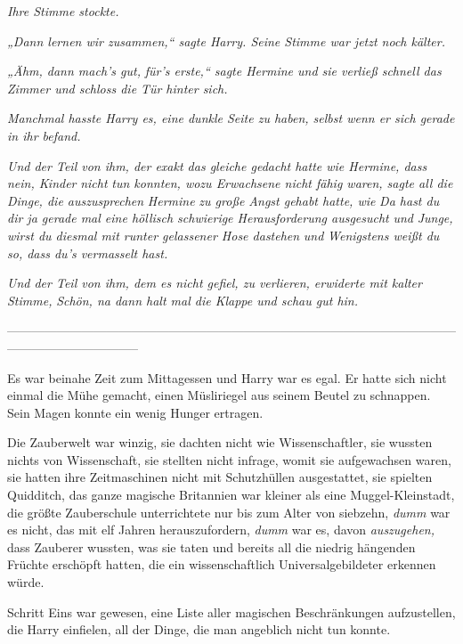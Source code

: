 {\emph{Ihre Stimme stockte.}

\emph{„Dann lernen wir zusammen,“ sagte Harry. Seine Stimme war jetzt noch kälter.}

\emph{„Ähm, dann mach's gut,} \emph{für's erste,“ sagte Hermine und sie verließ schnell das Zimmer und schloss die Tür hinter sich.}

\emph{Manchmal hasste Harry es, eine dunkle Seite zu haben, selbst wenn er sich gerade in ihr befand.}

\emph{Und der Teil von ihm, der exakt das gleiche gedacht hatte wie Hermine, dass nein, Kinder} \emph{\emph{nicht}} \emph{tun konnten, wozu Erwachsene nicht fähig waren, sagte all die Dinge, die auszusprechen} \emph{Hermine} \emph{zu große Angst gehabt hatte, wie} \emph{\emph{Da hast du dir ja gerade mal eine höllisch schwierige Herausforderung ausgesucht}} \emph{und} \emph{\emph{Junge, wirst du diesmal mit runter gelassener Hose dastehen}} \emph{und} \emph{\emph{Wenigstens weißt du so, dass du's vermasselt hast.}}

\emph{Und der Teil von ihm, dem es nicht gefiel, zu verlieren, erwiderte mit kalter Stimme,} \emph{\emph{Schön, na dann halt mal die Klappe und schau gut hin.}}

--------------------------------------------------------------------------------------------------------------------------------------------

\hfill\break Es war beinahe Zeit zum Mittagessen und Harry war es egal. Er hatte sich nicht einmal die Mühe gemacht, einen Müsliriegel aus seinem Beutel zu schnappen. Sein Magen konnte ein wenig Hunger ertragen.

Die Zauberwelt war winzig, sie dachten nicht wie Wissenschaftler, sie wussten nichts von Wissenschaft, sie stellten nicht infrage, womit sie aufgewachsen waren, sie hatten ihre Zeitmaschinen nicht mit Schutzhüllen ausgestattet, sie spielten Quidditch, das ganze magische Britannien war kleiner als eine Muggel-Kleinstadt, die größte Zauberschule unterrichtete nur bis zum Alter von siebzehn, \emph{dumm} war es nicht, das mit elf Jahren herauszufordern, \emph{dumm} war es, davon \emph{auszugehen,} dass Zauberer wussten, was sie taten und bereits all die niedrig hängenden Früchte erschöpft hatten, die ein wissenschaftlich Universalgebildeter erkennen würde.

Schritt Eins war gewesen, eine Liste aller magischen Beschränkungen aufzustellen, die Harry einfielen, all der Dinge, die man angeblich nicht tun konnte.

}
